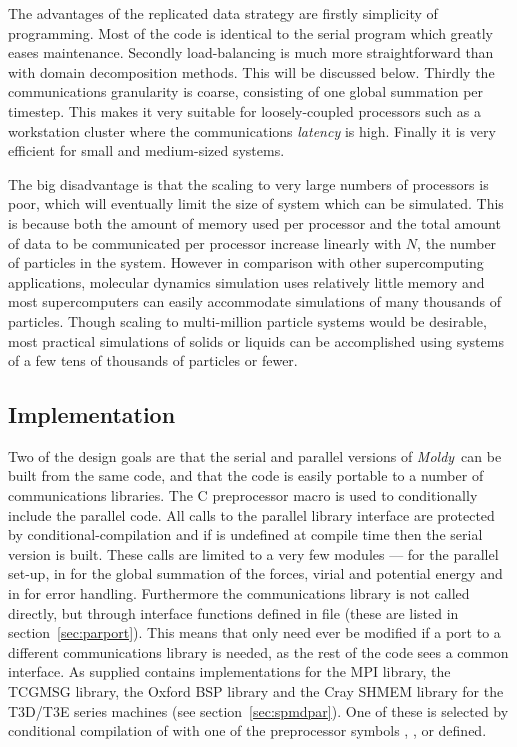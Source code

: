 \documentclass[a4paper,twoside]{report}
\newcommand{\moldy}{\emph{Moldy}}
\begin{document}
The advantages of the replicated data strategy are firstly simplicity
of programming.  Most of the code is identical to the serial program
which greatly eases maintenance.  Secondly load-balancing is much more
straightforward than with domain decomposition methods.  This will be
discussed below.  Thirdly the communications granularity is coarse,
consisting of one global summation per timestep.  This makes it very
suitable for loosely-coupled processors such as a workstation cluster
where the communications \emph{latency} is high.  Finally it is very
efficient for small and medium-sized systems.

The big disadvantage is that the scaling to very large numbers of
processors is poor, which will eventually limit the size of system
which can be simulated.  This is because both the amount of memory
used per processor and the total amount of data to be communicated per
processor increase linearly with $N$, the number of particles in the
system.  However in comparison with other supercomputing applications,
molecular dynamics simulation uses relatively little memory and most
supercomputers can easily accommodate simulations of many thousands of
particles.  Though scaling to multi-million particle systems
would be desirable, most practical simulations of solids or liquids
can be accomplished using systems of a few tens of thousands of
particles or fewer.

\subsection{Implementation}

Two of the design goals are that the serial and parallel versions of
\moldy\ can be built from the same code, and that the code is easily
portable to a number of communications libraries.  The C preprocessor
macro  is used to conditionally include the parallel
code. All calls to the parallel library interface are protected by
conditional-compilation and if  is undefined at compile
time then the serial version is built.  These calls are limited to a
very few modules ---  for the parallel set-up,
 in  for the global summation of the
forces, virial and potential energy and  in
 for error handling.  Furthermore the communications
library is not called directly, but through interface functions
defined in file  (these are listed in
section~\ref{sec:parport}).  This means that only  need
ever be modified if a port to a different communications library is
needed, as the rest of the code sees a common interface.  As supplied
 contains implementations for the MPI library, the
TCGMSG library, the Oxford BSP library and the Cray SHMEM library for
the T3D/T3E series machines (see section~\ref{sec:spmdpar}).  One of
these is selected by conditional compilation of  with
one of the preprocessor symbols , ,
 or  defined.
\end{document}

